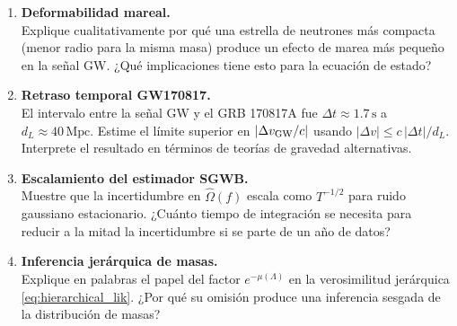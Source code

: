 \begin{enumerate}[leftmargin=2.2em, label=\textbf{P\arabic*.}]
\item \textbf{Deformabilidad mareal.} \\
Explique cualitativamente por qué una estrella de neutrones más compacta (menor radio para la misma masa) produce un efecto de marea más pequeño en la señal GW. ¿Qué implicaciones tiene esto para la ecuación de estado?

\item \textbf{Retraso temporal GW170817.} \\
El intervalo entre la señal GW y el GRB 170817A fue $\Delta t \approx 1.7\,\mathrm{s}$ a $d_L \approx 40\,\mathrm{Mpc}$. Estime el límite superior en $|\Delta v_{\rm GW}/c|$ usando $|\Delta v|\leq c\,|\Delta t|/d_L$. Interprete el resultado en términos de teorías de gravedad alternativas.

\item \textbf{Escalamiento del estimador SGWB.} \\
Muestre que la incertidumbre en $\hat\Omega(f)$ escala como $T^{-1/2}$ para ruido gaussiano estacionario. ¿Cuánto tiempo de integración se necesita para reducir a la mitad la incertidumbre si se parte de un año de datos?

\item \textbf{Inferencia jerárquica de masas.} \\
Explique en palabras el papel del factor $e^{-\mu(\Lambda)}$ en la verosimilitud jerárquica \eqref{eq:hierarchical_lik}. ¿Por qué su omisión produce una inferencia sesgada de la distribución de masas?

\end{enumerate}
